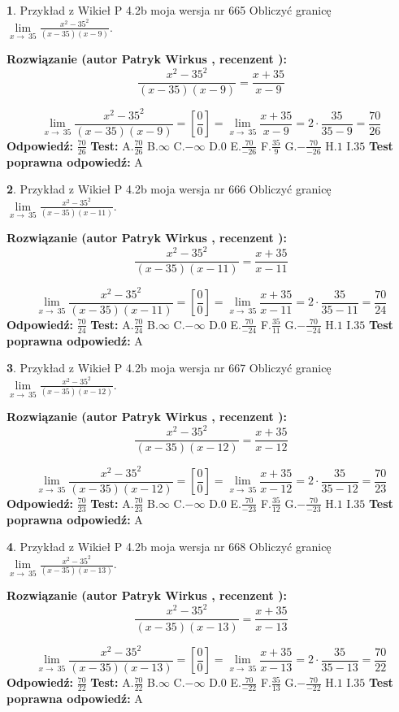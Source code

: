 \documentclass[12pt, a4paper]{article}
\theoremstyle{definition} %
\newtheorem{zad}{}
\newcommand{\zadStart}[1]{\begin{zad}#1\newline}
\newcommand{\zadStop}{\end{zad}}
\newcommand{\rozwStart}[2]{\noindent \textbf{Rozwiązanie (autor #1 , recenzent #2): }\newline}
\newcommand{\rozwStop}{\newline}
\newcommand{\odpStart}{\noindent \textbf{Odpowiedź:}\newline}
\newcommand{\odpStop}{\newline}
\newcommand{\testStart}{\noindent \textbf{Test:}\newline}
\newcommand{\testStop}{\newline}
\newcommand{\kluczStart}{\noindent \textbf{Test poprawna odpowiedź:}\newline}
\newcommand{\kluczStop}{\newline}
\begin{document}
\zadStart{Przykład z Wikieł P 4.2b moja wersja nr 665}
Obliczyć granicę $\lim\limits_{x\to\ 35}\frac{x^{2}-35^{2}}{(x-35)(x-9)}$.
\zadStop
\rozwStart{Patryk Wirkus}{}
$$\frac{x^{2}-35^{2}}{(x-35)(x-9)}=\frac{x+35}{x-9}$$

$$\lim\limits_{x\to\ 35}\frac{x^{2}-35^{2}}{(x-35)(x-9)}=[\frac{0}{0}]=\lim\limits_{x\to\ 35}\frac{x+35}{x-9}=2 \cdot \frac{35}{35-9} = \frac{70}{26}$$
\rozwStop
\odpStart
$\frac{70}{26}$
\odpStop
\testStart
A.$\frac{70}{26}$
B.$\infty$
C.$-\infty$
D.$0$
E.$\frac{70}{-26}$
F.$\frac{35}{9}$
G.$-\frac{70}{-26}$
H.$1$
I.$35$
\testStop
\kluczStart
A
\kluczStop



\zadStart{Przykład z Wikieł P 4.2b moja wersja nr 666}
Obliczyć granicę $\lim\limits_{x\to\ 35}\frac{x^{2}-35^{2}}{(x-35)(x-11)}$.
\zadStop
\rozwStart{Patryk Wirkus}{}
$$\frac{x^{2}-35^{2}}{(x-35)(x-11)}=\frac{x+35}{x-11}$$

$$\lim\limits_{x\to\ 35}\frac{x^{2}-35^{2}}{(x-35)(x-11)}=[\frac{0}{0}]=\lim\limits_{x\to\ 35}\frac{x+35}{x-11}=2 \cdot \frac{35}{35-11} = \frac{70}{24}$$
\rozwStop
\odpStart
$\frac{70}{24}$
\odpStop
\testStart
A.$\frac{70}{24}$
B.$\infty$
C.$-\infty$
D.$0$
E.$\frac{70}{-24}$
F.$\frac{35}{11}$
G.$-\frac{70}{-24}$
H.$1$
I.$35$
\testStop
\kluczStart
A
\kluczStop



\zadStart{Przykład z Wikieł P 4.2b moja wersja nr 667}
Obliczyć granicę $\lim\limits_{x\to\ 35}\frac{x^{2}-35^{2}}{(x-35)(x-12)}$.
\zadStop
\rozwStart{Patryk Wirkus}{}
$$\frac{x^{2}-35^{2}}{(x-35)(x-12)}=\frac{x+35}{x-12}$$

$$\lim\limits_{x\to\ 35}\frac{x^{2}-35^{2}}{(x-35)(x-12)}=[\frac{0}{0}]=\lim\limits_{x\to\ 35}\frac{x+35}{x-12}=2 \cdot \frac{35}{35-12} = \frac{70}{23}$$
\rozwStop
\odpStart
$\frac{70}{23}$
\odpStop
\testStart
A.$\frac{70}{23}$
B.$\infty$
C.$-\infty$
D.$0$
E.$\frac{70}{-23}$
F.$\frac{35}{12}$
G.$-\frac{70}{-23}$
H.$1$
I.$35$
\testStop
\kluczStart
A
\kluczStop



\zadStart{Przykład z Wikieł P 4.2b moja wersja nr 668}
Obliczyć granicę $\lim\limits_{x\to\ 35}\frac{x^{2}-35^{2}}{(x-35)(x-13)}$.
\zadStop
\rozwStart{Patryk Wirkus}{}
$$\frac{x^{2}-35^{2}}{(x-35)(x-13)}=\frac{x+35}{x-13}$$

$$\lim\limits_{x\to\ 35}\frac{x^{2}-35^{2}}{(x-35)(x-13)}=[\frac{0}{0}]=\lim\limits_{x\to\ 35}\frac{x+35}{x-13}=2 \cdot \frac{35}{35-13} = \frac{70}{22}$$
\rozwStop
\odpStart
$\frac{70}{22}$
\odpStop
\testStart
A.$\frac{70}{22}$
B.$\infty$
C.$-\infty$
D.$0$
E.$\frac{70}{-22}$
F.$\frac{35}{13}$
G.$-\frac{70}{-22}$
H.$1$
I.$35$
\testStop
\kluczStart
A
\kluczStop
\end{document}
